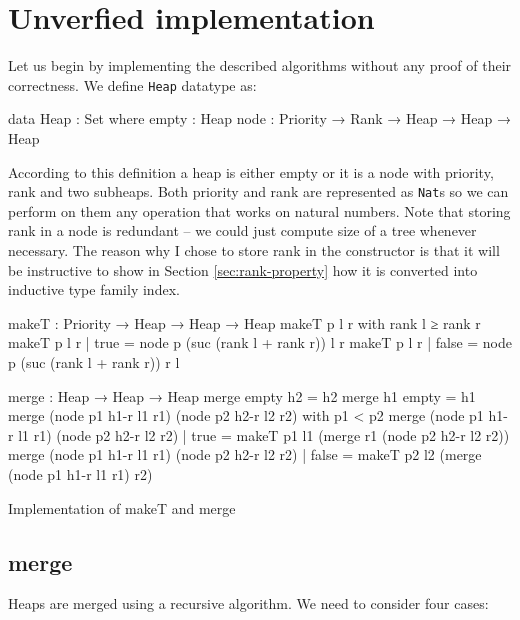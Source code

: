 \section[Unverfied implementation]{Unverfied implementation} \label{sec:no-proofs}
Let us begin by implementing the described algorithms without any proof of their correctness. We define \texttt{Heap} datatype as:

\begin{code}
data Heap : Set where
  empty : Heap
  node  : Priority → Rank → Heap → Heap → Heap
\end{code}

According to this definition a heap is either empty or it is a node with priority, rank and two subheaps. Both priority and rank are represented as \texttt{Nat}s so we can perform on them any operation that works on natural numbers. Note that storing rank in a node is redundant -- we could just compute size of a tree whenever necessary. The reason why I chose to store rank in the constructor is that it will be instructive to show in Section \ref{sec:rank-property} how it is converted into inductive type family index.

\begin{listing}[htb!]
\begin{code}
makeT : Priority → Heap → Heap → Heap
makeT p l r with rank l ≥ rank r
makeT p l r | true  = node p (suc (rank l + rank r)) l r
makeT p l r | false = node p (suc (rank l + rank r)) r l

merge : Heap → Heap → Heap
merge empty h2 = h2
merge h1 empty = h1
merge (node p1 h1-r l1 r1) (node p2 h2-r l2 r2)
  with p1 < p2
merge (node p1 h1-r l1 r1) (node p2 h2-r l2 r2)
  | true  = makeT p1 l1 (merge r1 (node p2 h2-r l2 r2))
merge (node p1 h1-r l1 r1) (node p2 h2-r l2 r2)
  | false = makeT p2 l2 (merge (node p1 h1-r l1 r1) r2)
\end{code}
\caption{Implementation of makeT and merge}\label{lst:makeT-merge}
\end{listing}

\subsection{merge}\label{sec:twopass-merge}

Heaps are merged using a recursive algorithm. We need to consider four cases:

